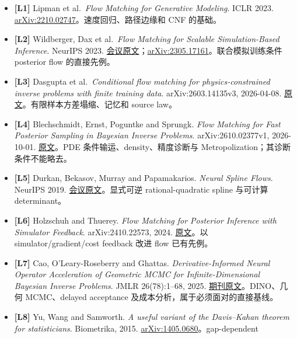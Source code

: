 \documentclass[
  11pt,
  a4paper,
]{article}
\providecommand{\tightlist}{%
  \setlength{\itemsep}{0pt}\setlength{\parskip}{0pt}}
\begin{document}
\begin{itemize}
\tightlist
\item
  \textbf{{[}L1{]}} Lipman et al.~\emph{Flow Matching for Generative
  Modeling}. ICLR 2023.
  \href{https://arxiv.org/abs/2210.02747}{arXiv:2210.02747}。速度回归、路径边缘和
  CNF 的基础。
\item
  \textbf{{[}L2{]}} Wildberger, Dax et al.~\emph{Flow Matching for
  Scalable Simulation-Based Inference}. NeurIPS 2023.
  \href{https://papers.neurips.cc/paper_files/paper/2023/hash/3663ae53ec078860bb0b9c6606e092a0-Abstract-Conference.html}{会议原文}；\href{https://arxiv.org/abs/2305.17161}{arXiv:2305.17161}。联合模拟训练条件
  posterior flow 的直接先例。
\item
  \textbf{{[}L3{]}} Dasgupta et al.~\emph{Conditional flow matching for
  physics-constrained inverse problems with finite training data}.
  arXiv:2603.14135v3, 2026-04-08.
  \href{https://arxiv.org/abs/2603.14135}{原文}。有限样本方差塌缩、记忆和
  source law。
\item
  \textbf{{[}L4{]}} Blechschmidt, Ernst, Poguntke and Sprungk.
  \emph{Flow Matching for Fast Posterior Sampling in Bayesian Inverse
  Problems}. arXiv:2610.02377v1, 2026-10-01.
  \href{https://arxiv.org/abs/2610.02377}{原文}。PDE
  条件输运、density、精度诊断与 Metropolization；其诊断条件不能略去。
\item
  \textbf{{[}L5{]}} Durkan, Bekasov, Murray and Papamakarios.
  \emph{Neural Spline Flows}. NeurIPS 2019.
  \href{https://papers.neurips.cc/paper_files/paper/2019/hash/7ac71d433f282034e088473244df8c02-Abstract.html}{会议原文}。显式可逆
  rational-quadratic spline 与可计算 determinant。
\item
  \textbf{{[}L6{]}} Holzschuh and Thuerey. \emph{Flow Matching for
  Posterior Inference with Simulator Feedback}. arXiv:2410.22573, 2024.
  \href{https://arxiv.org/abs/2410.22573}{原文}。以
  simulator/gradient/cost feedback 改进 flow 已有先例。
\item
  \textbf{{[}L7{]}} Cao, O'Leary-Roseberry and Ghattas.
  \emph{Derivative-Informed Neural Operator Acceleration of Geometric
  MCMC for Infinite-Dimensional Bayesian Inverse Problems}. JMLR
  26(78):1--68, 2025.
  \href{https://jmlr.org/papers/v26/24-0745.html}{期刊原文}。DINO、几何
  MCMC、delayed acceptance 及成本分析，属于必须面对的直接基线。
\item
  \textbf{{[}L8{]}} Yu, Wang and Samworth. \emph{A useful variant of the
  Davis--Kahan theorem for statisticians}. Biometrika, 2015.
  \href{https://arxiv.org/abs/1405.0680}{arXiv:1405.0680}。gap-dependent

\end{itemize}
\end{document}
